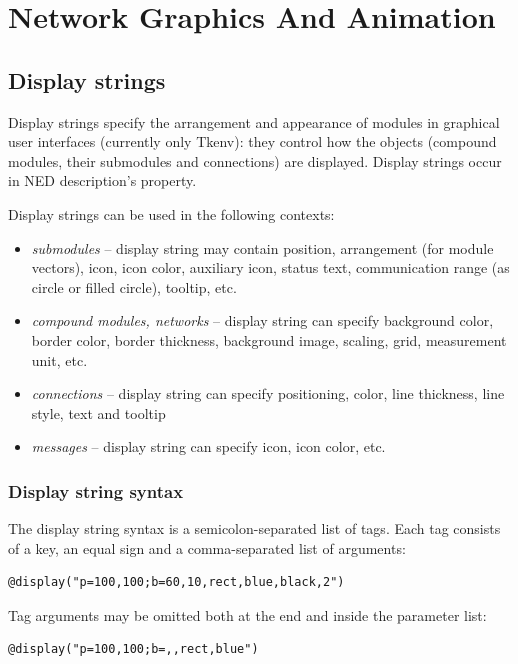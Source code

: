 \chapter{Network Graphics And Animation}
\label{cha:graphics}

\section{Display strings}
\label{sec:ch-graphics:display-strings}

Display strings specify the arrangement and
appearance of modules in graphical user interfaces (currently only
Tkenv): they control how the objects (compound modules, their
submodules and connections) are displayed. Display strings occur in
NED description's 
property.

Display strings can be used in the following contexts:
\begin{itemize}
  \item \textit{submodules} -- display string may contain position, arrangement
        (for module vectors), icon, icon color, auxiliary icon, status text,
        communication range (as circle or filled circle), tooltip, etc.
  \item \textit{compound modules, networks} -- display string can specify
        background color, border color, border thickness,
        background image, scaling, grid, measurement unit, etc.
  \item \textit{connections} -- display string can specify positioning, color,
        line thickness, line style, text and tooltip
  \item \textit{messages} -- display string can specify icon, icon color, etc.
\end{itemize}


\subsection{Display string syntax}

The display string syntax is a semicolon-separated list of tags.
Each tag consists of a key, an equal sign and a comma-separated list of
arguments:
\begin{verbatim}
@display("p=100,100;b=60,10,rect,blue,black,2")
\end{verbatim}

Tag arguments may be omitted both at the end and inside the
parameter list:
\begin{verbatim}
@display("p=100,100;b=,,rect,blue")
\end{verbatim}

